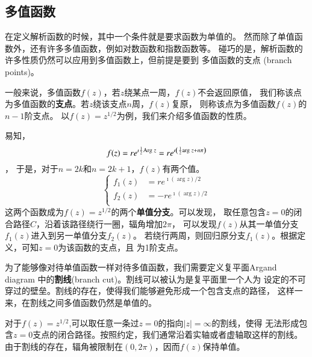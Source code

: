 \subsection{多值函数}
在定义解析函数的时候，其中一个条件就是要求函数为单值的。
然而除了单值函数外，还有许多多值函数，例如对数函数和指数函数等。
碰巧的是，解析函数的许多性质仍然可以应用到多值函数上，但前提是要到
多值函数的支点 (branch points)。

一般来说，多值函数$f(z)$，若$z$绕某点一周，$f(z)$不会返回原值，
我们称该点为多值函数的\textbf{支点}。若$z$绕该支点$n$周，$f(z)$复原，
则称该点为多值函数$f(z)$的$n-1$阶支点。
以$f(z) = z^{1/2}$为例，我们来介绍多值函数的性质。

易知，\[
    f(z) = r e^{\imath \frac{1}{2}  {\mathrm{Arg}\;} z}
    =  r e^{\imath \left( \frac{1}{2} {\mathrm{arg}\;} z + n \pi \right)}
    \]，
于是，对于$n= 2k$和$n=2k+1$，$f(z)$有两个值。
\begin{equation}
    \left\{\begin{aligned}
    f_1(z) & =r e^{\imath(\arg z) / 2} \\
    f_2(z) & =-r e^{\imath(\arg z) / 2} \\
    \end{aligned}\right.
\end{equation}
这两个函数成为$f(z)= z^{1/2}$的两个\textbf{单值分支}。可以发现，
取任意包含$z=0$的闭合路径$C$，沿着该路径绕行一圈，辐角增加$2\pi$，
可以发现$f(z)$从其一单值分支$f_1(z)$进入到另一单值分支$f_2(z)$。
若绕行两周，则回归原分支$f_1(z)$。根据定义，可知$z=0$为该函数的支点，且
为1阶支点。

为了能够像对待单值函数一样对待多值函数，我们需要定义复平面Argand diagram
中的\textbf{割线}(branch cut)。割线可以被认为是复平面里一个人为
设定的不可穿过的壁垒。割线的存在，使得我们能够避免形成一个包含支点的路径，
这样一来，在割线之间多值函数仍然是单值的。

对于$f(z)=z^{1/2}$,可以取任意一条过$z=0$的指向$|z|=\infty$的割线，使得
无法形成包含$z=0$支点的闭合路径。按照约定，我们通常沿着实轴或者虚轴取这样的割线。
由于割线的存在，辐角被限制在$(0,2\pi)$，因而$f(z)$保持单值。

